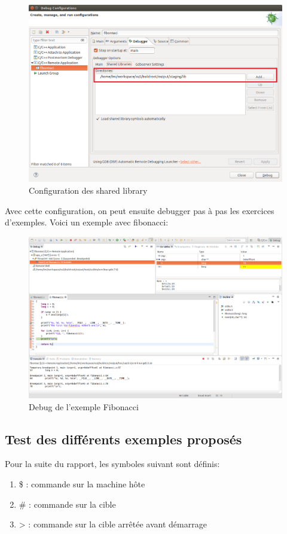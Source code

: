 \begin{figure}[H]
	\begin{center}
		\includegraphics[width=14cm]{img/eclipseConfig4.png}
		\caption{Configuration des shared library}
		\label{eclipseConfig4}
	\end{center}
\end{figure}
Avec cette configuration, on peut ensuite debugger pas à pas les exercices d’exemples. Voici un exemple avec fibonacci:
\begin{figure}[H]
	\begin{center}
		\includegraphics[width=16.5cm]{img/eclipseConfig5.png}
		\caption{Debug de l'exemple Fibonacci}
		\label{eclipseConfig5}
	\end{center}
\end{figure}
\subsection{Test des différents exemples proposés}
Pour la suite du rapport, les symboles suivant sont définis:
\begin{enumerate}
	\item \$ : commande sur la machine hôte
	\item \# : commande sur la cible
	\item > : commande sur la cible arrêtée avant démarrage
\end{enumerate}

